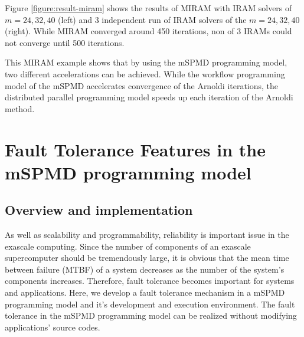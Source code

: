 \documentclass[graybox]{svmult}
\begin{document}
Figure \ref{figure:result-miram} shows the results of MIRAM with IRAM solvers of $m=24, 32, 40$ 
 (left) and 3 independent run of IRAM solvers of the $m=24, 32, 40$ (right). While MIRAM converged around 450 iterations, non of 3 IRAMs could not converge until 500 iterations. 

 This MIRAM example shows that by using the mSPMD programming model, two different accelerations can be achieved. While the workflow programming model of the mSPMD accelerates convergence of the Arnoldi iterations, the distributed parallel programming model speeds up each iteration of the Arnoldi method. 


\section{Fault Tolerance Features in the mSPMD programming model}
\label{section:fault tolerance}

\subsection{Overview and implementation}

As well as scalability and programmability, reliability is important issue in the exascale computing. Since the number of components of an exascale supercomputer should be tremendously large, it is obvious that the mean time between failure (MTBF) of a system decreases as the number of the system's components increases.  
Therefore, fault tolerance becomes important for systems and applications. 
Here, we develop a fault tolerance mechanism in a mSPMD programming model and it's development and execution environment. The fault tolerance in the mSPMD programming model can be realized without modifying applications' source codes\cite{tsuji2015i}. 
\end{document}
